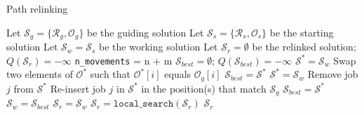 \begin{algorithm}[htbp!]
\caption{Path relinking}
\label{alg:pathrelinking}
\begin{algorithmic}[1]
\State Let $\mathcal{S}_g = \{\mathcal{R}_g, \mathcal{O}_g\}$ be the guiding solution
\State Let $\mathcal{S}_s = \{\mathcal{R}_s, \mathcal{O}_s\}$ be the starting solution
\State Let $\mathcal{S}_w = \mathcal{S}_s$ be the working solution
\State Let $\mathcal{S}_r = \emptyset$ be the relinked solution;  $Q(\mathcal{S}_r) = -\infty$
\State \texttt{n\_movements} = n + m
 \label{alg:prmainwhile}
		\State $\mathcal{S}_{best} = \emptyset$; $Q(\mathcal{S}_{best}) = -\infty$
			\State $\mathcal{S}^* = \mathcal{S}_w$
				\State Swap two elements of $\mathcal{O}^*$ such that $\mathcal{O}^*[i]$ equals $\mathcal{O}_g[i]$
					\State $\mathcal{S}_{best} = \mathcal{S^*}$
				\EndIf
			\EndIf
		\EndFor %
			\State $\mathcal{S}^* = \mathcal{S}_w$
				\State Remove job $j$ from $\mathcal{S^*}$
				\State Re-insert job $j$ in $\mathcal{S^*}$ in the position(s) that match $\mathcal{S}_g$ \label{alg:prforinsertion}
				\State $\mathcal{S}_{best} = \mathcal{S^*}$
			\EndIf
		\EndFor %
		\State $\mathcal{S}_w = \mathcal{S}_{best}$
			\State $\mathcal{S}_r = \mathcal{S}_w$
		\EndIf
	\EndFor
\EndWhile
\State $\mathcal{S}_r = \texttt{local\_search}(\mathcal{S}_r)$
\Return $\mathcal{S}_r$
\end{algorithmic}
\end{algorithm}
